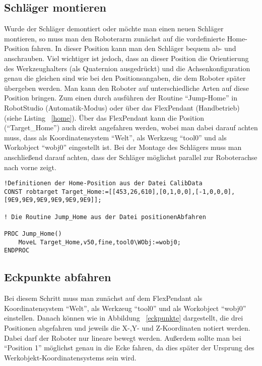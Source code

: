\subsection{Schläger montieren}
Wurde der Schläger demontiert oder möchte man einen neuen Schläger montieren, so muss man den Roboterarm zunächst auf die vordefinierte Home-Position fahren. In dieser Position kann man den Schläger bequem ab- und anschrauben. Viel wichtiger ist jedoch, dass an dieser Position die Orientierung des Werkzeughalters (als Quaternion ausgedrückt) und die Achsenkonfiguration genau die gleichen sind wie bei den Positionsangaben, die dem Roboter später übergeben werden. Man kann den Roboter auf unterschiedliche Arten auf diese Position bringen. Zum einen durch ausführen der Routine \enquote{Jump-Home} in RobotStudio (Automatik-Modus) oder über das FlexPendant (Handbetrieb) (siehe Listing ~\ref{home}). Über das FlexPendant kann die Position (\enquote{Target\_Home}) auch direkt angefahren werden, wobei man dabei darauf achten muss, dass als Koordinatensystem \enquote{Welt}, als Werkzeug \enquote{tool0} und als Workobject \enquote{wobj0} eingestellt ist. Bei der Montage des Schlägers muss man anschließend darauf achten, dass der Schläger möglichst parallel zur Roboterachse nach vorne zeigt. 

\begin{lstlisting}[caption=RAPID-Routine: Jump-Home, label=home]
!Definitionen der Home-Position aus der Datei CalibData
CONST robtarget Target_Home:=[[453,26,610],[0,1,0,0],[-1,0,0,0],[9E9,9E9,9E9,9E9,9E9,9E9]];

! Die Routine Jump_Home aus der Datei positionenAbfahren

PROC Jump_Home()
    MoveL Target_Home,v50,fine,tool0\WObj:=wobj0;
ENDPROC
\end{lstlisting} 

\subsection{Eckpunkte abfahren}

Bei diesem Schritt muss man zunächst auf dem FlexPendant als Koordinatensystem \enquote{Welt}, als Werkzeug \enquote{tool0} und als Workobject \enquote{wobj0} einstellen. Danach können wie in Abbildung ~\ref{eckpunkte} dargestellt, die drei Positionen abgefahren und jeweils die X-,Y- und Z-Koordinaten notiert werden. Dabei darf der Roboter nur lineare bewegt werden. Außerdem sollte man bei \enquote{Position 1} möglichst genau in die Ecke fahren, da dies später der Ursprung des Werkobjekt-Koordinatensystems sein wird. 

